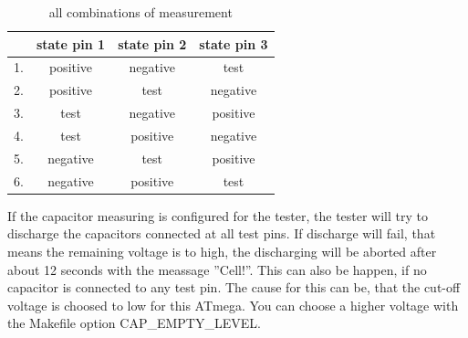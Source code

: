 \begin{table}[H]
  \begin{center}
    \begin{tabular}{| l | c | c | c |}
    \hline
      & state pin 1 & state pin 2 & state pin 3 \\
    \hline
   1. & positive    &  negative    &  test \\
   2. & positive    &  test       & negative \\
   3. & test        &  negative    & positive \\
   4. & test        &  positive    & negative \\
   5. & negative     &  test       & positive \\
   6. & negative     &  positive    &  test  \\
    \hline
    \end{tabular}
  \end{center}
  \caption{all combinations of measurement}
  \label{tab:case} 
\end{table}

If the capacitor measuring is configured for the tester, the tester will try to discharge the capacitors connected at all
test pins.
If discharge will fail, that means the remaining voltage is to high, the discharging will be aborted after about 12 seconds
with the meassage ''Cell!''. This can also be happen, if no capacitor is connected to any test pin.
The cause for this can be, that the cut-off voltage is choosed to low for this ATmega.
You can choose a higher voltage with the Makefile option CAP\_EMPTY\_LEVEL.

